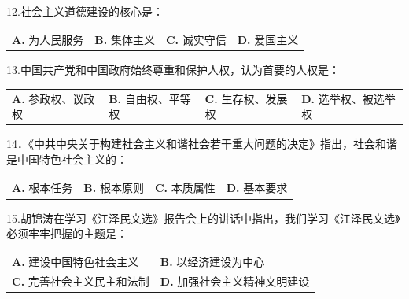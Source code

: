 \documentclass[UTF8,11pt]{ctexart}
\begin{document}
12.社会主义道德建设的核心是：


\begin{center}\begin{tabular}{>{\raggedright\arraybackslash}p{\dimexpr(\linewidth-8\tabcolsep)/4\relax}>{\raggedright\arraybackslash}p{\dimexpr(\linewidth-8\tabcolsep)/4\relax}>{\raggedright\arraybackslash}p{\dimexpr(\linewidth-8\tabcolsep)/4\relax}>{\raggedright\arraybackslash}p{\dimexpr(\linewidth-8\tabcolsep)/4\relax}}
\textbf{A.} 为人民服务 & \textbf{B.} 集体主义 & \textbf{C.} 诚实守信 & \textbf{D.} 爱国主义\\[.35em]\end{tabular}\end{center}

13.中国共产党和中国政府始终尊重和保护人权，认为首要的人权是：


\begin{center}\begin{tabular}{>{\raggedright\arraybackslash}p{\dimexpr(\linewidth-8\tabcolsep)/4\relax}>{\raggedright\arraybackslash}p{\dimexpr(\linewidth-8\tabcolsep)/4\relax}>{\raggedright\arraybackslash}p{\dimexpr(\linewidth-8\tabcolsep)/4\relax}>{\raggedright\arraybackslash}p{\dimexpr(\linewidth-8\tabcolsep)/4\relax}}
\textbf{A.} 参政权、议政权 & \textbf{B.} 自由权、平等权 & \textbf{C.} 生存权、发展权 & \textbf{D.} 选举权、被选举权\\[.35em]\end{tabular}\end{center}

14．《中共中央关于构建社会主义和谐社会若干重大问题的决定》指出，社会和谐是中国特色社会主义的：


\begin{center}\begin{tabular}{>{\raggedright\arraybackslash}p{\dimexpr(\linewidth-8\tabcolsep)/4\relax}>{\raggedright\arraybackslash}p{\dimexpr(\linewidth-8\tabcolsep)/4\relax}>{\raggedright\arraybackslash}p{\dimexpr(\linewidth-8\tabcolsep)/4\relax}>{\raggedright\arraybackslash}p{\dimexpr(\linewidth-8\tabcolsep)/4\relax}}
\textbf{A.} 根本任务 & \textbf{B.} 根本原则 & \textbf{C.} 本质属性 & \textbf{D.} 基本要求\\[.35em]\end{tabular}\end{center}

15.胡锦涛在学习《江泽民文选》报告会上的讲话中指出，我们学习《江泽民文选》必须牢牢把握的主题是：


\begin{center}\begin{tabular}{>{\raggedright\arraybackslash}p{\dimexpr(\linewidth-4\tabcolsep)/2\relax}>{\raggedright\arraybackslash}p{\dimexpr(\linewidth-4\tabcolsep)/2\relax}}
\textbf{A.} 建设中国特色社会主义 & \textbf{B.} 以经济建设为中心\\[.35em]
\textbf{C.} 完善社会主义民主和法制 & \textbf{D.} 加强社会主义精神文明建设\\[.35em]\end{tabular}\end{center}
\end{document}
